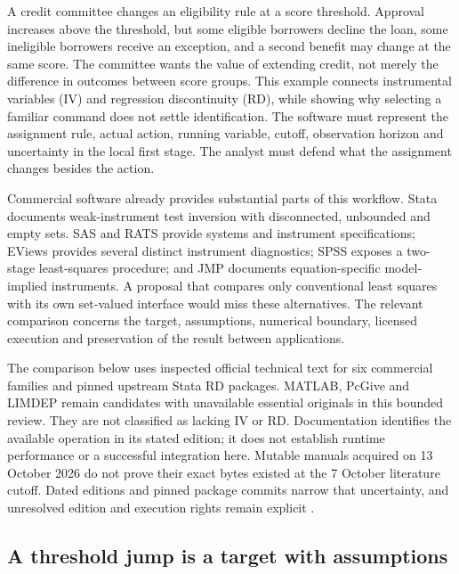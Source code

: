 A credit committee changes an eligibility rule at a score threshold. Approval
increases above the threshold, but some eligible borrowers decline the loan,
some ineligible borrowers receive an exception, and a second benefit may
change at the same score. The committee wants the value of extending credit,
not merely the difference in outcomes between score groups. This example
connects instrumental variables (IV) and regression discontinuity (RD), while
showing why selecting a familiar command does not settle identification.
The software must represent the assignment rule, actual action, running
variable, cutoff, observation horizon and uncertainty in the local first
stage. The analyst must defend what the assignment changes besides the action.

Commercial software already provides substantial parts of this workflow.
Stata documents weak-instrument test inversion with disconnected, unbounded
and empty sets. SAS and RATS provide systems and instrument specifications;
EViews provides several distinct instrument diagnostics; SPSS exposes a
two-stage least-squares procedure; and JMP documents equation-specific
model-implied instruments. A proposal that compares only conventional least
squares with its own set-valued interface would miss these alternatives.
The relevant comparison concerns the target, assumptions, numerical boundary,
licensed execution and preservation of the result between applications.

The comparison below uses inspected official technical text for six commercial
families and pinned upstream Stata RD packages. MATLAB, PcGive and LIMDEP
remain candidates with unavailable essential originals in this bounded
review. They are not classified as lacking IV or RD. Documentation identifies
the available operation in its stated edition; it does not establish runtime
performance or a successful integration here. Mutable manuals acquired on
13 October 2026 do not prove their exact bytes existed at the 7 October
literature cutoff. Dated editions and pinned package commits narrow that
uncertainty, and unresolved edition and execution rights remain explicit
\citep{exec13_ivrd_survey}.

\subsection{A threshold jump is a target with assumptions}

